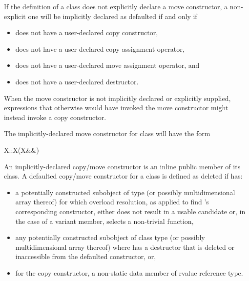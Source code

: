 \pnum
{}%
If the definition of a class  does not explicitly declare
a move constructor, a non-explicit one will be
implicitly declared as defaulted if and only if
\begin{itemize}
\item
{} does not have a user-declared copy constructor,

\item
{} does not have a user-declared copy assignment operator,

\item
{} does not have a user-declared move assignment operator, and

\item
{} does not have a user-declared destructor.
\end{itemize}

\begin{note}
When the move constructor is not implicitly declared or explicitly supplied,
expressions that otherwise would have invoked the move constructor might instead invoke
a copy constructor.
\end{note}

\pnum
The implicitly-declared move constructor for class  will have the form
\begin{codeblock}
X::X(X&&)
\end{codeblock}

\pnum
An implicitly-declared copy/move constructor is an
inline public member of its class.
A defaulted copy/\brk{}move constructor for a class
   is defined as deleted if  has:
\begin{itemize}
\item a potentially constructed subobject of type
   (or possibly multidimensional array thereof) for which
  overload resolution, as applied to find
  's corresponding constructor,
  either does not result in a usable candidate or,
  in the case of a variant member, selects a non-trivial function,

\item any potentially constructed subobject of
  class type  (or possibly multidimensional array thereof)
  where  has
  a destructor that is deleted or inaccessible from the defaulted
  constructor, or,

\item for the copy constructor, a non-static data member of rvalue reference type.
\end{itemize}

